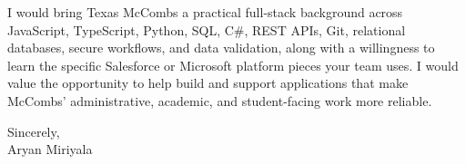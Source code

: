 \documentclass[letterpaper,11pt]{article}
\begin{document}
I would bring Texas McCombs a practical full-stack background across JavaScript, TypeScript, Python, SQL, C\#, REST APIs, Git, relational databases, secure workflows, and data validation, along with a willingness to learn the specific Salesforce or Microsoft platform pieces your team uses. I would value the opportunity to help build and support applications that make McCombs' administrative, academic, and student-facing work more reliable.

Sincerely,\\
Aryan Miriyala
\end{document}

